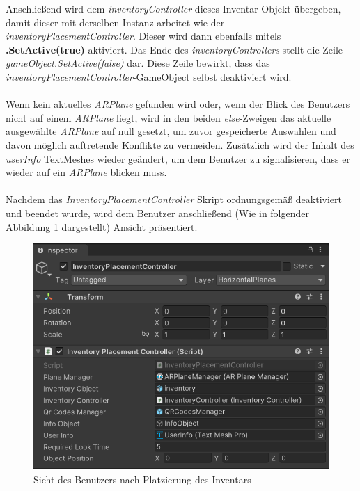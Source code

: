 Anschließend wird dem \textit{inventoryController} dieses Inventar-Objekt übergeben, damit dieser mit derselben Instanz
arbeitet wie der \textit{inventoryPlacementController}. Dieser wird dann ebenfalls mitels \textbf{.SetActive(true)} aktiviert.
Das Ende des \textit{inventoryControllers} stellt die Zeile \textit{gameObject.SetActive(false)} dar. Diese Zeile bewirkt,
dass das \textit{inventoryPlacementController}-GameObject selbst deaktiviert wird.\\
\\
Wenn kein aktuelles \textit{ARPlane} gefunden wird oder, wenn der Blick des Benutzers nicht auf einem \textit{ARPlane}
liegt, wird in den beiden \textit{else}-Zweigen das aktuelle ausgewählte \textit{ARPlane} auf null gesetzt, um zuvor
gespeicherte Auswahlen und davon möglich auftretende Konflikte zu vermeiden. Zusätzlich wird der Inhalt des \textit{userInfo}
TextMeshes wieder geändert, um dem Benutzer zu signalisieren, dass er wieder auf ein \textit{ARPlane} blicken muss.
\\
\\
Nachdem das \textit{InventoryPlacementController} Skript ordnungsgemäß deaktiviert und beendet wurde, wird dem Benutzer
anschließend (Wie in folgender Abbildung \ref{fig:inventoryPlaced} dargestellt) Ansicht präsentiert.
\begin{figure}[H]
    \centering
    \includegraphics[scale=0.8]{images/invPlace_Editor}
    \caption{Sicht des Benutzers nach Platzierung des Inventars}
    \label{fig:inventoryPlaced}
\end{figure}

